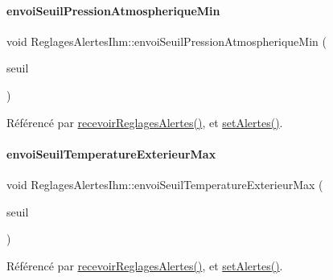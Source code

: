 \paragraph{\texorpdfstring{envoi\+Seuil\+Pression\+Atmospherique\+Min}{envoiSeuilPressionAtmospheriqueMin}}
{\footnotesize\ttfamily void Reglages\+Alertes\+Ihm\+::envoi\+Seuil\+Pression\+Atmospherique\+Min (\begin{DoxyParamCaption}\item[{Q\+String}]{seuil }\end{DoxyParamCaption})\hspace{0.3cm}{\ttfamily [signal]}}



Référencé par \hyperlink{class_reglages_alertes_ihm_a5c40f718b28b948a90574ef0c2d3e587}{recevoir\+Reglages\+Alertes()}, et \hyperlink{class_reglages_alertes_ihm_aeb0331a6103f944cb15cdd62985ca231}{set\+Alertes()}.

\mbox{\label{class_reglages_alertes_ihm_a626e1067d882bb5c0b86c8e0fb063dcc}} 
\paragraph{\texorpdfstring{envoi\+Seuil\+Temperature\+Exterieur\+Max}{envoiSeuilTemperatureExterieurMax}}
{\footnotesize\ttfamily void Reglages\+Alertes\+Ihm\+::envoi\+Seuil\+Temperature\+Exterieur\+Max (\begin{DoxyParamCaption}\item[{Q\+String}]{seuil }\end{DoxyParamCaption})\hspace{0.3cm}{\ttfamily [signal]}}



Référencé par \hyperlink{class_reglages_alertes_ihm_a5c40f718b28b948a90574ef0c2d3e587}{recevoir\+Reglages\+Alertes()}, et \hyperlink{class_reglages_alertes_ihm_aeb0331a6103f944cb15cdd62985ca231}{set\+Alertes()}.

\mbox{\label{class_reglages_alertes_ihm_a5c4cadb3f7a76cecc0bafaa297b2898a}} 
